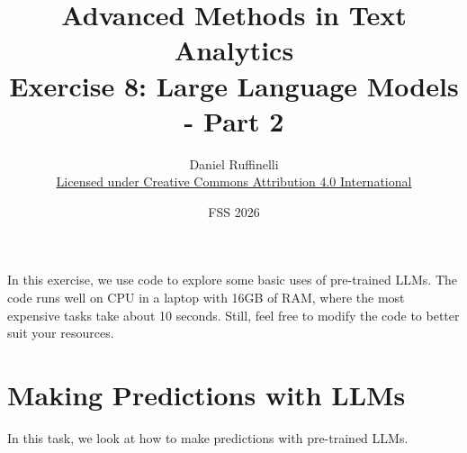 \documentclass[11pt,a4paper]{article}
\title{Advanced Methods in Text Analytics \\ 
Exercise 8: Large Language Models - Part 2}
\author{Daniel Ruffinelli \\ \href{https://creativecommons.org/licenses/by/4.0/}{Licensed under Creative Commons Attribution 4.0 International}}
\date{FSS 2026}
\begin{document}
\maketitle

In this exercise, we use code to explore some basic uses of pre-trained LLMs.
The code runs well on CPU in a laptop with 16GB of RAM, where the most expensive
tasks take about 10 seconds. Still, feel free to modify the code to better suit
your resources.



\section{Making Predictions with LLMs}

In this task, we look at how to make predictions with pre-trained LLMs.
\end{document}
